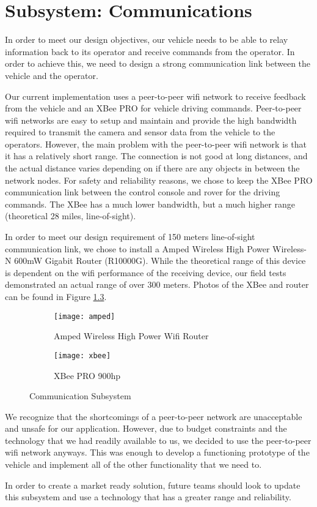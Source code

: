 \chapter{Subsystem: Communications} \label{chap:communications}

In order to meet our design objectives, our vehicle needs to be able to relay information back to its operator and receive commands from the operator.  In order to achieve this, we need to design a strong communication link between the vehicle and the operator.

Our current implementation uses a peer-to-peer wifi network to receive feedback from the vehicle and an XBee PRO for vehicle driving commands.  Peer-to-peer wifi networks are easy to setup and maintain and provide the high bandwidth required to transmit the camera and sensor data from the vehicle to the operators. However, the main problem with the peer-to-peer wifi network is that it has a relatively short range. The connection is not good at long distances, and the actual distance varies depending on if there are any objects in between the network nodes. For safety and reliability reasons, we chose to keep the XBee PRO communication link between the control console and rover for the driving commands. The XBee has a much lower bandwidth, but a much higher range (theoretical 28 miles, line-of-sight).

In order to meet our design requirement of 150 meters line-of-sight communication link, we chose to install a  Amped Wireless High Power Wireless-N 600mW Gigabit Router (R10000G). While the theoretical range of this device is dependent on the wifi performance of the receiving device, our field tests demonstrated an actual range of over 300 meters. Photos of the XBee and router can be found in Figure \ref{fig:test}.

\begin{figure}[H]
	\centering
	\begin{subfigure}{.35\textwidth}
		\centering
		\texttt{[image: amped]}
		\caption{Amped Wireless High Power Wifi Router}
		\label{fig:sub1}
	\end{subfigure}%
	\begin{subfigure}{.35\textwidth}
		\centering
		\texttt{[image: xbee]}
		\caption{XBee PRO 900hp}
		\label{fig:sub2}
	\end{subfigure}
	\caption{Communication Subsystem}
	\label{fig:test}
\end{figure}

We recognize that the shortcomings of a peer-to-peer network are unacceptable and unsafe for our application. However, due to budget constraints and the technology that we had readily available to us, we decided to use the peer-to-peer wifi network anyways. This was enough to develop a functioning prototype of the vehicle and implement all of the other functionality that we need to.

In order to create a market ready solution, future teams should look to update this subsystem and use a technology that has a greater range and reliability.